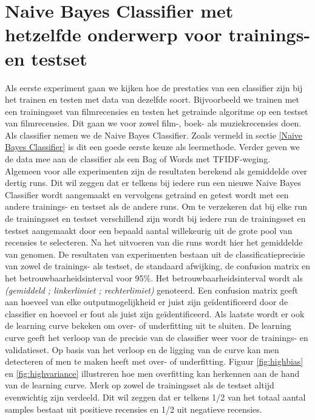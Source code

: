 \section{Naive Bayes Classifier met hetzelfde onderwerp voor trainings- en testset}\label{Naive Bayes Classifier met hetzelfde onderwerp voor trainings- en testset}

Als eerste experiment gaan we kijken hoe de prestaties van een classifier zijn bij het trainen en testen met data van dezelfde soort. Bijvoorbeeld we trainen met een trainingsset van filmrecensies en testen het getrainde algoritme op een testset van filmrecensies. Dit gaan we voor zowel film-, boek- als muziekrecensies doen. Als classifier nemen we de Naive Bayes Classifier. Zoals vermeld in sectie \ref{Naive Bayes Classifier} is  dit een goede eerste keuze als leermethode. Verder geven we de data mee aan de classifier als een Bag of Words met TFIDF-weging.\\
%
Algemeen voor alle experimenten zijn de resultaten berekend als gemiddelde over dertig runs. Dit wil zeggen dat er telkens bij iedere run een nieuwe Naive Bayes Classifier wordt aangemaakt en vervolgens getraind en getest wordt met een andere trainings- en testset als de andere runs. Om te verzekeren dat bij elke run de trainingsset en testset verschillend zijn wordt bij iedere run de trainingsset en testset aangemaakt  door een bepaald aantal willekeurig uit de grote pool van recensies te selecteren. Na het uitvoeren van die runs wordt hier het gemiddelde van genomen. De resultaten van experimenten bestaan uit de classificatieprecisie van zowel de trainings- als testset, de standaard afwijking, de confusion matrix en het betrouwbaarheidsinterval voor 95\%. Het betrouwbaarheidsinterval wordt als \textit{(gemiddeld ; linkerlimiet ; rechterlimiet)} genoteerd. Een confusion matrix geeft aan hoeveel van elke outputmogelijkheid er juist zijn ge\"identificeerd door de classifier en hoeveel er fout als juist zijn ge\"identificeerd. Als laatste wordt er ook de learning curve bekeken om over- of underfitting uit te sluiten. De learning curve geeft het verloop van de precisie van de classifier weer voor de trainings- en validatieset. Op basis van het verloop en de ligging van de curve kan men detecteren of men te maken heeft met over- of underfitting. Figuur \ref{fig:highbias} en \ref{fig:highvariance} illustreren hoe men overfitting kan herkennen aan de hand van de learning curve. Merk op zowel de trainingsset als de testset altijd evenwichtig zijn verdeeld. Dit wil zeggen dat er telkens 1/2 van het totaal aantal samples bestaat uit positieve recensies en 1/2 uit negatieve recensies.
